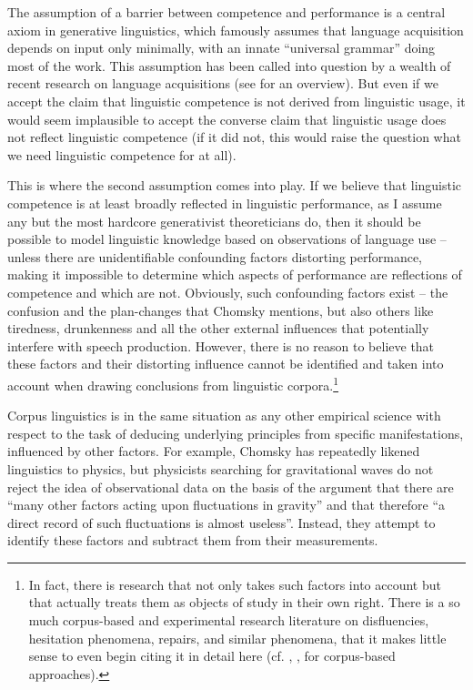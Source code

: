 The assumption of a barrier between competence and performance is a central axiom in generative linguistics, which famously assumes that language acquisition depends on input only minimally, with an innate ``universal grammar'' doing most of the work. This assumption has been called into question by a wealth of recent research on language acquisitions (see \citet{tomasello_constructing_2003} for an overview). But even if we accept the claim that linguistic competence is not derived from linguistic usage, it would seem implausible to accept the converse claim that linguistic usage does not reflect linguistic competence (if it did not, this would raise the question what we need linguistic competence for at all).

This is where the second assumption comes into play. If we believe that linguistic competence is at least broadly reflected in linguistic performance, as I assume any but the most hardcore generativist theoreticians do, then it should be possible to model linguistic knowledge based on observations of language use -- unless there are unidentifiable confounding factors distorting performance, making it impossible to determine which aspects of performance are reflections of competence and which are not. Obviously, such confounding factors exist -- the confusion and the plan-changes that Chomsky mentions, but also others like tiredness, drunkenness and all the other external influences that potentially interfere with speech production. However, there is no reason to believe that these factors and their distorting influence cannot be identified and taken into account when drawing conclusions from linguistic corpora.\footnote{In fact, there is research that not only takes such factors into account but that actually treats them as objects of study in their own right. There is a so much corpus-based and experimental research literature on disfluencies, hesitation phenomena, repairs, and similar phenomena, that it makes little sense to even begin citing it in detail here (cf. \citealt{kjellmer_hesitation._2003}, \citealt{corley_hesitation_2008}, \citealt{gilquin_errors_2011} for corpus-based approaches).} 

Corpus linguistics is in the same situation as any other empirical science with respect to the task of deducing underlying principles from specific manifestations, influenced by other factors. For example, Chomsky has repeatedly likened linguistics to physics, but physicists searching for gravitational waves do not reject the idea of observational data on the basis of the argument that there are ``many other factors acting upon fluctuations in gravity'' and that therefore ``a direct record of such fluctuations is almost useless''. Instead, they attempt to identify these factors and subtract them from their measurements.

